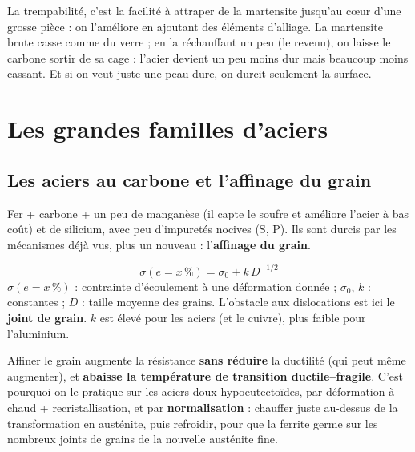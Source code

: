 \begin{goatbox}
La trempabilité, c'est la facilité à attraper de la martensite jusqu'au c\oe ur d'une grosse
pièce : on l'améliore en ajoutant des éléments d'alliage. La martensite brute casse comme du
verre ; en la réchauffant un peu (le revenu), on laisse le carbone sortir de sa cage : l'acier
devient un peu moins dur mais beaucoup moins cassant. Et si on veut juste une peau dure, on durcit
seulement la surface.
\end{goatbox}

\section{Les grandes familles d'aciers}

\subsection*{Les aciers au carbone et l'affinage du grain}

Fer + carbone + un peu de manganèse (il capte le soufre et améliore l'acier à bas coût) et de
silicium, avec peu d'impuretés nocives (S, P). Ils sont durcis par les mécanismes déjà vus, plus
un nouveau : l'\textbf{affinage du grain}.

\begin{thmbox}[title={Loi de Hall--Petch (à connaître par c\oe ur)}]
\[ \sigma(e = x\,\%) = \sigma_0 + k\,D^{-1/2} \]
$\sigma(e=x\,\%)$ : contrainte d'écoulement à une déformation donnée ; $\sigma_0$, $k$ :
constantes ; $D$ : taille moyenne des grains. L'obstacle aux dislocations est ici le
\textbf{joint de grain}. $k$ est élevé pour les aciers (et le cuivre), plus faible pour l'aluminium.
\end{thmbox}


\begin{propbox}[title={Le seul mécanisme \og tout bénéfice\fg{}}]
Affiner le grain augmente la résistance \textbf{sans réduire} la ductilité (qui peut même
augmenter), et \textbf{abaisse la température de transition ductile--fragile}. C'est pourquoi on
le pratique sur les aciers doux hypoeutectoïdes, par déformation à chaud + recristallisation, et
par \textbf{normalisation} : chauffer juste au-dessus de la transformation en austénite, puis
refroidir, pour que la ferrite germe sur les nombreux joints de grains de la nouvelle austénite
fine.
\end{propbox}

